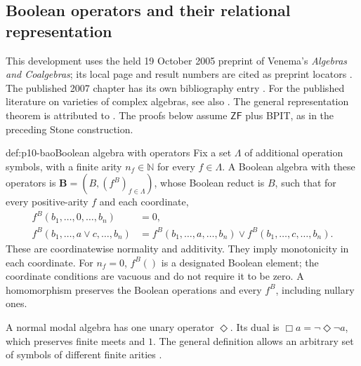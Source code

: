 
\subsection{Boolean operators and their relational representation}
\label{sec:p10-boolean-operators}

This development uses the held 19 October 2005 preprint of Venema's
\emph{Algebras and Coalgebras}; its local page and result numbers
are cited as preprint locators \cite{Venema2005Preprint}.
The published 2007 chapter has its own bibliography entry
\cite{Venema2007}.
For the published literature on varieties of complex algebras,
see also \textcite{Goldblatt1989}.
The general representation theorem is attributed to
\textcite{JonssonTarski1951}.
The proofs below assume \(\mathsf{ZF}\) plus BPIT, as in the
preceding Stone construction.

\begin{hbdefinition}{def:p10-bao}{Boolean algebra with operators}
Fix a set \(\Lambda\) of additional operation symbols, with a finite
arity \(n_f\in\mathbb N\) for every \(f\in\Lambda\).
A Boolean algebra with these operators is
\(\mathbf B=(B,(f^B)_{f\in\Lambda})\), whose Boolean reduct is \(B\),
such that for every positive-arity \(f\) and each coordinate,
\[
\begin{aligned}
 f^B(b_1,\ldots,0,\ldots,b_n)&=0,\\
 f^B(b_1,\ldots,a\vee c,\ldots,b_n)
 &=f^B(b_1,\ldots,a,\ldots,b_n)
       \vee f^B(b_1,\ldots,c,\ldots,b_n).
\end{aligned}
\]
These are coordinatewise normality and additivity.
They imply monotonicity in each coordinate.
For \(n_f=0\), \(f^B()\) is a designated Boolean element; the
coordinate conditions are vacuous and do not require it to be zero.
A homomorphism preserves the Boolean operations and every \(f^B\),
including nullary ones.

A normal modal algebra has one unary operator \(\Diamond\).
Its dual is \(\Box a=\neg\Diamond\neg a\), which preserves finite
meets and \(1\).
The general definition allows an arbitrary set of symbols of
different finite arities
\cite[preprint Definition~3.11, p.~9]{Venema2005Preprint}.
\end{hbdefinition}

